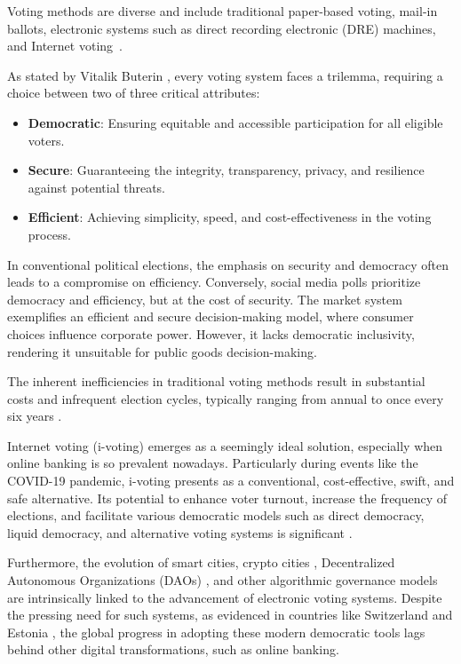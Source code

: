 \documentclass[runningheads]{llncs}
\begin{document}
Voting methods are diverse and include traditional paper-based voting, mail-in ballots, electronic systems such as direct recording electronic (DRE) machines, and Internet voting~\cite{parkGoingBadWorse2021}.

As stated by Vitalik Buterin \cite{buterinBlockchainVotingOverrated2021}, every voting system faces a trilemma, requiring a choice between two of three critical attributes:

\begin{itemize}
\item \textbf{Democratic}: Ensuring equitable and accessible participation for all eligible voters.
\item \textbf{Secure}: Guaranteeing the integrity, transparency, privacy, and resilience against potential threats.
\item \textbf{Efficient}: Achieving simplicity, speed, and cost-effectiveness in the voting process.
\end{itemize}

In conventional political elections, the emphasis on security and democracy often leads to a compromise on efficiency. Conversely, social media polls prioritize democracy and efficiency, but at the cost of security. The market system exemplifies an efficient and secure decision-making model, where consumer choices influence corporate power. However, it lacks democratic inclusivity, rendering it unsuitable for public goods decision-making.

The inherent inefficiencies in traditional voting methods result in substantial costs and infrequent election cycles, typically ranging from annual to once every six years \cite{buterinBlockchainVotingOverrated2021}.

Internet voting (i-voting) emerges as a seemingly ideal solution, especially when online banking is so prevalent nowadays. Particularly during events like the COVID-19 pandemic, i-voting presents as a conventional, cost-effective, swift, and safe alternative. Its potential to enhance voter turnout, increase the frequency of elections, and facilitate various democratic models such as direct democracy, liquid democracy, and alternative voting systems is significant \cite{laslierLoserPluralityVoting2011}.

Furthermore, the evolution of smart cities, crypto cities \cite{buterinCryptoCities2021}, Decentralized Autonomous Organizations (DAOs) \cite{wangDecentralizedAutonomousOrganizations2019}, and other algorithmic governance models are intrinsically linked to the advancement of electronic voting systems. Despite the pressing need for such systems, as evidenced in countries like Switzerland \cite{ElectronicVotingSwitzerland2023} and Estonia \cite{ElectronicVotingEstonia2023}, the global progress in adopting these modern democratic tools lags behind other digital transformations, such as online banking.
\end{document}

